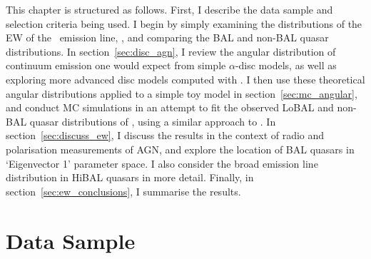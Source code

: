 This chapter is structured as follows. First, I describe
the data sample and selection criteria being used. I begin by
simply examining the distributions of the EW of the \oiiifull\ emission line,
\ewo, and comparing the BAL and non-BAL quasar distributions. 
In section~\ref{sec:disc_agn}, I review the angular distribution of 
continuum emission one would expect from simple $\alpha$-disc models, 
as well as exploring more advanced disc models computed
with \agn. I then use these theoretical 
angular distributions applied to a simple toy model in 
section~\ref{sec:mc_angular}, and conduct MC simulations in an attempt to fit 
the observed LoBAL and non-BAL quasar distributions of \ewo, using a similar approach to 
\cite{risaliti2011}. In section~\ref{sec:discuss_ew}, I discuss the results
in the context of radio and polarisation measurements of AGN,
and explore the location of BAL quasars in `Eigenvector 1' parameter space.
I also consider the broad emission line distribution in HiBAL quasars in more detail. 
Finally, in section~\ref{sec:ew_conclusions}, I summarise the results.


\section{Data Sample}

